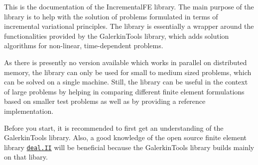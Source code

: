 This is the documentation of the Incremental\+FE library. The main purpose of the library is to help with the solution of problems formulated in terms of incremental variational principles. The library is essentially a wrapper around the functionalities provided by the Galerkin\+Tools library, which adds solution algorithms for non-\/linear, time-\/dependent problems.

As there is presently no version available which works in parallel on distributed memory, the library can only be used for small to medium sized problems, which can be solved on a single machine. Still, the library can be useful in the context of large problems by helping in comparing different finite element formulations based on smaller test problems as well as by providing a reference implementation.

Before you start, it is recommended to first get an understanding of the Galerkin\+Tools library. Also, a good knowledge of the open source finite element library \href{http://www.dealii.org}{\tt deal.\+II} will be beneficial because the Galerkin\+Tools library builds mainly on that libary. 